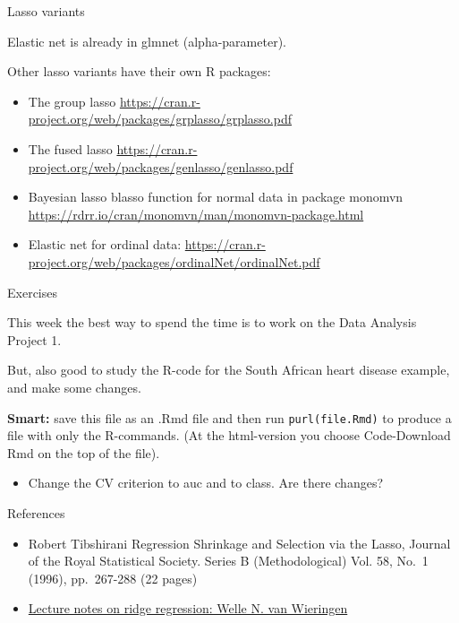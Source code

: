 \documentclass[
  ignorenonframetext,
]{beamer}
\providecommand{\tightlist}{%
  \setlength{\itemsep}{0pt}\setlength{\parskip}{0pt}}
\begin{document}
\begin{frame}

\begin{block}{Lasso variants}

Elastic net is already in glmnet (alpha-parameter).

Other lasso variants have their own R packages:

\begin{itemize}
\item
  The group lasso
  \url{https://cran.r-project.org/web/packages/grplasso/grplasso.pdf}
\item
  The fused lasso
  \url{https://cran.r-project.org/web/packages/genlasso/genlasso.pdf}
\item
  Bayesian lasso blasso function for normal data in package monomvn
  \url{https://rdrr.io/cran/monomvn/man/monomvn-package.html}
\item
  Elastic net for ordinal data:
  \url{https://cran.r-project.org/web/packages/ordinalNet/ordinalNet.pdf}
\end{itemize}

\end{block}

\end{frame}

\begin{frame}[fragile]{Exercises}
\protect\hypertarget{exercises}{}

This week the best way to spend the time is to work on the Data Analysis
Project 1.

But, also good to study the R-code for the South African heart disease
example, and make some changes.

\textbf{Smart:} save this file as an .Rmd file and then run
\texttt{purl(file.Rmd)} to produce a file with only the R-commands. (At
the html-version you choose Code-Download Rmd on the top of the file).

\begin{itemize}
\tightlist
\item
  Change the CV criterion to auc and to class. Are there changes?
\end{itemize}

\end{frame}

\begin{frame}{References}
\protect\hypertarget{references}{}

\begin{itemize}
\tightlist
\item
  Robert Tibshirani Regression Shrinkage and Selection via the Lasso,
  Journal of the Royal Statistical Society. Series B (Methodological)
  Vol. 58, No.~1 (1996), pp.~267-288 (22 pages)
\item
  \href{https://arxiv.org/pdf/1509.09169.pdf}{Lecture notes on ridge
  regression: Welle N. van Wieringen}
\end{itemize}

\end{frame}
\end{document}
